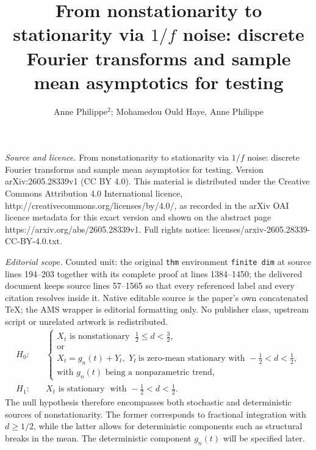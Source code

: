 \documentclass[10pt,a4paper]{amsart}
\numberwithin{equation}{section}
\begin{document}
\title[From nonstationarity to stationarity via 1/f noise: discrete]{From nonstationarity to stationarity via $1/f$ noise: discrete Fourier transforms and sample mean asymptotics for testing}
\author{Anne Philippe$^2$; Mohamedou Ould Haye, Anne Philippe}
\date{}
\maketitle
\noindent\emph{Source and licence.} From nonstationarity to stationarity via $1/f$ noise: discrete Fourier transforms and sample mean asymptotics for testing. Version arXiv:2605.28339v1 (CC BY 4.0). This material is distributed under the Creative Commons Attribution 4.0 International licence, http://creativecommons.org/licenses/by/4.0/, as recorded in the arXiv OAI licence metadata for this exact version and shown on the abstract page https://arxiv.org/abs/2605.28339v1. Full rights notice: licenses/arxiv-2605.28339-CC-BY-4.0.txt.\par\smallskip
\noindent\textit{Editorial scope.} Counted unit: the original \texttt{thm} environment \texttt{finite dim} at source lines 194--203 together with its complete proof at lines 1384--1450; the delivered document keeps source lines 57--1565 so that every referenced label and every citation resolves inside it. Native editable source is the paper's own concatenated TeX; the AMS wrapper is editorial formatting only. No publisher class, upstream script or unrelated artwork is redistributed.
\[
\begin{aligned}
H_0:\quad &
\left\{
\begin{array}{l}
X_t\textrm{ is nonstationary } \; \tfrac12 \le d < \tfrac32, \\
\text{or} \\
X_t=g_n(t)+Y_t,\,\, Y_t\ \textrm{is zero-mean stationary with } -\tfrac12 < d < \tfrac12,\\
\textrm{with }g_n(t)\textrm{ being a nonparametric trend,}
\end{array}
\right.
\\[1em]
H_1:\quad & X_t\textrm{ is stationary }\;\textrm{with } -\tfrac12 < d < \tfrac12.
\end{aligned}
\]
The null hypothesis therefore encompasses both stochastic and deterministic sources of nonstationarity. The former corresponds to fractional integration with $d\ge 1/2$, while the latter allows for deterministic components such as structural breaks in the mean. The deterministic component $g_n(t)$ will be specified later.\\
\end{document}
